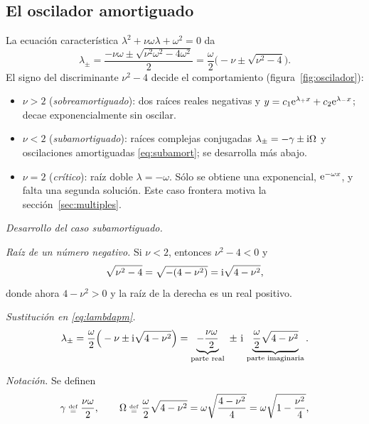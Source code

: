 \documentclass[11pt,twoside]{article}
\begin{document}
\subsection{El oscilador amortiguado}

\begin{ejemplo}[$y''+\nu\omega\,y'+\omega^2y=0$, con $\nu\ge0$, $\omega>0$]\label{ej:oscilador}
La ecuación característica $\lambda^2+\nu\omega\lambda+\omega^2=0$ da
\begin{equation}\label{eq:lambdapm}
\lambda_\pm=\frac{-\nu\omega\pm\sqrt{\nu^2\omega^2-4\omega^2}}{2}=\frac\omega2\Big(-\nu\pm\sqrt{\nu^2-4}\Big).
\end{equation}
El signo del discriminante $\nu^2-4$ decide el comportamiento (figura~\ref{fig:oscilador}):
\begin{itemize}
\item $\nu>2$ (\emph{sobreamortiguado}): dos raíces reales negativas y $y=c_1\mathrm{e}^{\lambda_+x}+c_2\mathrm{e}^{\lambda_-x}$; decae
exponencialmente sin oscilar.
\item $\nu<2$ (\emph{subamortiguado}): raíces complejas conjugadas $\lambda_\pm=-\gamma\pm\mathrm{i}\Omega$ y oscilaciones
amortiguadas \eqref{eq:subamort}; se desarrolla más abajo.
\item $\nu=2$ (\emph{crítico}): raíz doble $\lambda=-\omega$. Sólo se obtiene una exponencial, $\mathrm{e}^{-\omega x}$, y falta una
segunda solución. Este caso frontera motiva la sección~\ref{sec:multiples}.
\end{itemize}
\emph{Desarrollo del caso subamortiguado.}
\begin{pasos}
\item \emph{Raíz de un número negativo.} Si $\nu<2$, entonces $\nu^2-4<0$ y
\begin{equation*}
\sqrt{\nu^2-4}=\sqrt{-(4-\nu^2)}=\mathrm{i}\sqrt{4-\nu^2},
\end{equation*}
donde ahora $4-\nu^2>0$ y la raíz de la derecha es un real positivo.
\item \emph{Sustitución en \eqref{eq:lambdapm}.}
\begin{equation*}
\lambda_\pm=\frac\omega2\Big(-\nu\pm\mathrm{i}\sqrt{4-\nu^2}\Big)=\underbrace{-\frac{\nu\omega}{2}}_{\text{parte real}}\ \pm\ \mathrm{i}\,
\underbrace{\frac\omega2\sqrt{4-\nu^2}}_{\text{parte imaginaria}}.
\end{equation*}
\item \emph{Notación.} Se definen
\begin{equation*}
\gamma\defeq\frac{\nu\omega}{2},\qquad\Omega\defeq\frac\omega2\sqrt{4-\nu^2}=\omega\sqrt{\frac{4-\nu^2}{4}}=\omega\sqrt{1-\frac{\nu^2}{4}},

\end{equation*}
\end{pasos}
\end{ejemplo}
\end{document}
